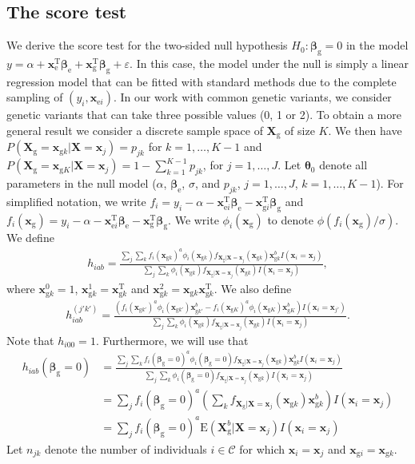 \documentclass[10pt,a4paper]{article}
\def\bbetag{\bm{\beta}_{\text{g}}}
\def\bbetae{\bm{\beta}_{\text{e}}}
\def\bx{\mathbf{x}}
\def\bX{\mathbf{X}}
\def\bxgi{\mathbf{x}_{\text{g}i}}
\def\bxei{\mathbf{x}_{\text{e}i}}
\def\bxgk{\mathbf{x}_{\text{g}k}}
\def\bxgkk{\mathbf{x}_{\text{g}k'}}
\def\bxgK{\mathbf{x}_{\text{g}K}}
\def\bxg{\mathbf{x}_{\text{g}}}
\def\bxe{\mathbf{x}_{\text{e}}}
\def\bXg{\mathbf{X}_{\text{g}}}
\def\E{\text{E}}
\begin{document}
\subsection{The score test}
We derive the score test for the two-sided null hypothesis $H_0: \bbetag = 0$ in the model $y = \alpha + \bxe^{\text{T}} \bbetae + \bxg^{\text{T}} \bbetag + \varepsilon $. In this case, the model under the null is simply a linear regression model that can be fitted with standard methods due to the complete sampling of $(y_i, \bxei)$. In our work with common genetic variants, we consider genetic variants that can take three possible values (0, 1 or 2). To obtain a more general result we consider a discrete sample space of $\bXg$ of size $K$. We then have $P(\bXg = \bxgk|\bX = \bx_j) = p_{jk}$ for $k = 1,\ldots,K-1$ and $P(\bXg = \bxgK|\bX = \bx_j) = 1-\sum_{k=1}^{K-1}p_{jk}$, for $j = 1, \ldots, J$. Let $\boldsymbol\theta_0$ denote all parameters in the null model ($\alpha$, $\bbetae$, $\sigma$, and $p_{jk}$, $j=1,\ldots,J$, $k=1,\ldots,K-1$). For simplified notation, we write $f_i = y_i - \alpha - \bxei^{\text{T}} \bbetae - \bxgi^{\text{T}} \bbetag$ and $f_i(\bxg) = y_i - \alpha - \bxei^{\text{T}} \bbetae - \bxg^{\text{T}} \bbetag$. We write $\phi_i(\bxg)$ to denote $\phi(f_i(\bxg)/\sigma)$. We define
\begin{align*}
h_{iab} = \frac{\sum_j \sum_{k} f_i(\bxgk)^a \phi_i(\bxgk) f_{\bXg|\bX = \bx_j}(\bxgk) \bxgk^b I(\bx_i = \bx_j)}{\sum_j \sum_{k}\phi_i(\bxgk) f_{\bXg|\bX = \bx_j}(\bxgk) I(\bx_i = \bx_j)},
\end{align*}
where $\bxgk^0 = 1$, $\bxgk^1 = \bxgk^{\text{T}}$ and $\bxgk^2 = \bxgk \bxgk^{\text{T}}$. We also define
\begin{align*}
h_{iab}^{(j'k')} = \frac{ \left(f_i(\bxgkk)^a \phi_i(\bxgkk) \bxgkk^b - f_i(\bxgK)^a \phi_i(\bxgK) \bxgK^b \right)I(\bx_i = \bx_{j'})}{\sum_j \sum_{k}\phi_i(\bxgk) f_{\bXg|\bX = \bx_j}(\bxgk) I(\bx_i = \bx_j)}.
\end{align*}
Note that $h_{i00} = 1$. Furthermore, we will use that
\begin{align*}
h_{iab}(\bbetag = 0) &= \frac{\sum_j \sum_{k} f_i(\bbetag = 0)^a \phi_i(\bbetag = 0) f_{\bXg|\bX = \bx_j}(\bxgk) \bxgk^b I(\bx_i = \bx_j)}{\sum_j \sum_{k}\phi_i(\bbetag = 0) f_{\bXg|\bX = \bx_j}(\bxgk) I(\bx_i = \bx_j)} \\
& = \sum_j f_i(\bbetag = 0)^a \left( \sum_{k} f_{\bXg|\bX = \bx_j}(\bxgk) \bxgk^b \right) I(\bx_i = \bx_j) \\
& = \sum_j f_i(\bbetag = 0)^a \E(\bXg^b|\bX = \bx_j) I(\bx_i = \bx_j)
\end{align*}
Let $n_{jk}$ denote the number of individuals $i \in \mathcal{C}$ for which $\bx_i = \bx_{j}$ and $\bxgi = \bxgk$. 
\end{document}
